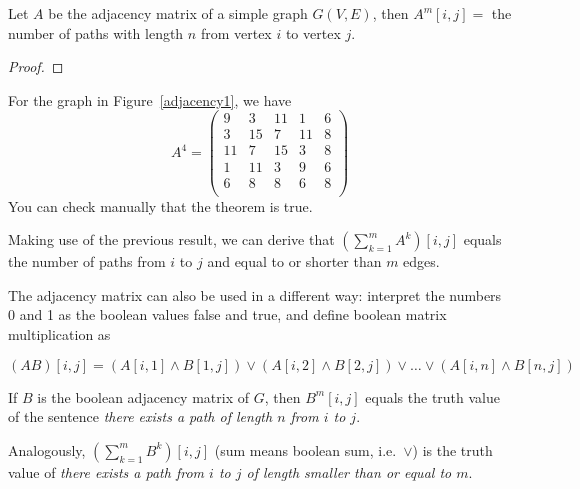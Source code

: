 \begin{theorem}\label{aantalpathen}
Let $A$ be the adjacency matrix of a simple graph $G(V,E)$,
then
$A^{m}[i,j] = $ the number of paths with length $n$ from vertex $i$ to vertex
$j$.
\end{theorem}

\begin{proof}
\end{proof}

For the graph in Figure~\ref{adjacency1}, we have
\begin{equation*}
A^{4} = 
	\left(\begin{array}{ccccc}
		9 & 3 & 11& 1 & 6\\
		3 & 15& 7 & 11& 8\\
		11& 7 & 15& 3 & 8\\
		1 & 11& 3 & 9 & 6\\
		6 & 8 & 8 & 6 & 8\\
	\end{array}\right)
\end{equation*}
You can check manually that the theorem is true.

Making use of the previous result, we can derive that $(\sum_{k=1}^{m}
A^{k})[i,j]$ equals the number of paths from $i$ to $j$ and equal to
or shorter than $m$ edges.

The adjacency matrix can also be used in a different way: interpret
the numbers 0 and 1 as the boolean values false and true, and
define boolean matrix multiplication as

\[(AB)[i,j] = (A[i,1] \wedge B[1,j]) \vee (A[i,2] \wedge B[2,j]) \vee
\ldots \vee (A[i,n] \wedge B[n,j])\]

If $B$ is the boolean adjacency matrix of $G$, then $B^{m}[i,j]$
equals the truth value of the sentence {\em there exists a path of
length $n$ from $i$ to $j$}.

Analogously, $(\sum_{k=1}^{m} B^{k})[i,j]$ (sum means boolean sum,
i.e.\ $\vee$) is the truth value of {\em there exists a path from $i$
to $j$ of length smaller than or equal to $m$}.

